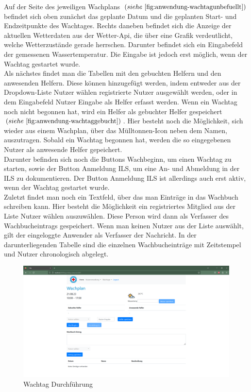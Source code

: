 \documentclass[fontsize=12pt,openright,oneside,paper=a4,BCOR=1cm]{scrbook}
\begin{document}
Auf der Seite des jeweiligen Wachplans $(siehe~\ref{fig:anwendung-wachtagunbefuellt})$ befindet sich oben zun\"achst das geplante Datum und die geplanten Start- und Endzeitpunkte des Wachtages. Rechts daneben befindet sich die Anzeige der aktuellen Wetterdaten aus der Wetter-Api, die \"uber eine Grafik verdeutlicht, welche Wetterzust\"ande gerade herrschen. Darunter befindet sich ein Eingabefeld der gemessenen Wassertemperatur. Die Eingabe ist jedoch erst m\"oglich, wenn der Wachtag gestartet wurde. \\
Als n\"achstes findet man die Tabellen mit den gebuchten Helfern und den anwesenden Helfern. Diese k\"onnen hinzugef\"ugt werden, indem entweder aus der Dropdown-Liste \glqq Nutzer w\"ahlen\grqq{} registrierte Nutzer ausgew\"ahlt werden, oder in dem Eingabefeld \glqq Nutzer Eingabe\grqq{} als Helfer erfasst werden. Wenn ein Wachtag noch nicht begonnen hat, wird ein Helfer als gebuchter Helfer gespeichert $(siehe~\ref{fig:anwendung-wachtaggebucht})$. Hier besteht noch die M\"oglichkeit, sich wieder aus einem Wachplan, \"uber das M\"ulltonnen-Icon neben dem Namen, auszutragen. Sobald ein Wachtag begonnen hat, werden die so eingegebenen Nutzer als anwesende Helfer gepeichert. \\
Darunter befinden sich noch die Buttons \glqq Wachbeginn\grqq{}, um einen Wachtag zu starten, sowie der Button \glqq Anmeldung ILS\grqq{}, um eine An- und Abmeldung in der ILS zu dokumentieren. Der Button \glqq Anmeldung ILS\grqq{} ist allerdings auch erst aktiv, wenn der Wachtag gestartet wurde. \\
Zuletzt findet man noch ein Textfeld, \"uber das man Eintr\"age in das Wachbuch schreiben kann. Hier besteht die M\"oglichkeit ein registriertes Mitglied aus der Liste \glqq Nutzer w\"ahlen\grqq{} auszuw\"ahlen. Diese Person wird dann als Verfasser des Wachbucheintrags gespeichert. Wenn man keinen Nutzer aus der Liste ausw\"ahlt, gilt der eingeloggte Anwender als Verfasser der Nachricht. In der darunterliegenden Tabelle sind die einzelnen Wachbucheintr\"age mit Zeitstempel und Nutzer chronologisch abgelegt.

\begin{figure}[H]
  \centering
    \includegraphics[width=0.7\linewidth]{Anlagen/Anwendung/8WachtagUnbefuellt.png}
    \caption{Wachtag Durchf\"uhrung}
  \label{fig:anwendung-wachtagunbefuellt}
\end{figure}
\end{document}
